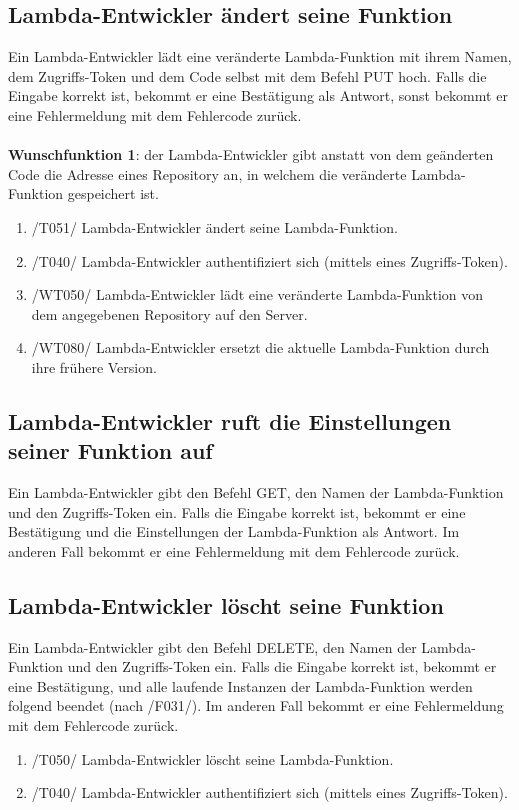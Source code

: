 \documentclass[a4paper,20pt,oneside]{book}
\begin{document}
\subsection{\gls{Lambda-Entwickler} ändert seine Funktion}
Ein \Gls{Lambda-Entwickler} lädt eine veränderte \gls{Lambda-Funktion} mit ihrem Namen, dem Zugriffs-\gls{Token} und dem Code selbst mit dem Befehl PUT hoch. Falls die Eingabe korrekt ist, bekommt er eine Bestätigung als Antwort, sonst bekommt er eine Fehlermeldung mit dem Fehlercode zurück.\\\\
\textbf{Wunschfunktion 1}: der \Gls{Lambda-Entwickler} gibt anstatt von dem geänderten Code die Adresse eines \Gls{Repository} an, in welchem die veränderte \gls{Lambda-Funktion} gespeichert ist.\\
\begin{enumerate}
\item /T051/ \Gls{Lambda-Entwickler} ändert seine \gls{Lambda-Funktion}.
\item /T040/ \Gls{Lambda-Entwickler} authentifiziert sich (mittels eines Zugriffs-\gls{Token}).
\item /WT050/ \Gls{Lambda-Entwickler} lädt eine veränderte \gls{Lambda-Funktion} von dem angegebenen \Gls{Repository} auf den Server.
\item /WT080/ \Gls{Lambda-Entwickler} ersetzt die aktuelle \gls{Lambda-Funktion} durch ihre frühere Version.
\\
\end{enumerate} 
\subsection{\gls{Lambda-Entwickler} ruft die Einstellungen seiner Funktion auf}
Ein \Gls{Lambda-Entwickler} gibt den Befehl GET, den Namen der \gls{Lambda-Funktion} und den Zugriffs-\gls{Token} ein. Falls die Eingabe korrekt ist, bekommt er eine Bestätigung und die Einstellungen der \gls{Lambda-Funktion} als Antwort. Im anderen Fall bekommt er eine Fehlermeldung mit dem Fehlercode zurück.\\
\subsection{\gls{Lambda-Entwickler} löscht seine Funktion}
Ein \Gls{Lambda-Entwickler} gibt den Befehl DELETE, den Namen der \gls{Lambda-Funktion} und den Zugriffs-\gls{Token} ein. Falls die Eingabe korrekt ist, bekommt er eine Bestätigung, und alle laufende Instanzen der \gls{Lambda-Funktion} werden folgend beendet (nach /F031/). Im anderen Fall bekommt er eine Fehlermeldung mit dem Fehlercode zurück.\\
\begin{enumerate}
\item /T050/ \Gls{Lambda-Entwickler} löscht seine \gls{Lambda-Funktion}.
\item /T040/ \Gls{Lambda-Entwickler} authentifiziert sich (mittels eines Zugriffs-\gls{Token}).
\\
\end{enumerate} 
\end{document}
